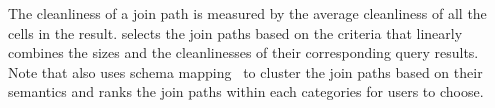 {The cleanliness of a join path is measured by the average cleanliness of all the cells in the result. \dcv selects the join paths based on the criteria that linearly combines the sizes and the cleanlinesses of their corresponding query results. Note that \dcv also uses schema mapping~\cite{DBLP:conf/cidr/StonebrakerBIBCZPX13} to cluster the join paths based on their semantics and ranks the join paths within each categories for users to choose.}







